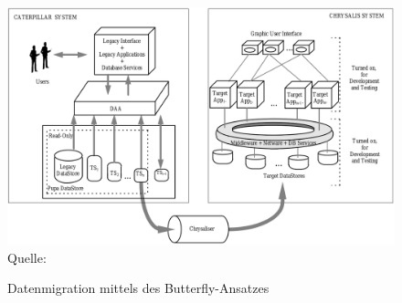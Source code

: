 \begin{figure}[!t]
	\centering
	\caption{Datenmigration mittels des Butterfly-Ansatzes}
	\label{pic:datemigration_Butterfly}
	\includegraphics[width=1.0\textwidth]{../images/vorgehensweisen_fig_01.png} \\
	\small Quelle: \citep[Abbildung~11]{wuLawless-1997}
\end{figure}



